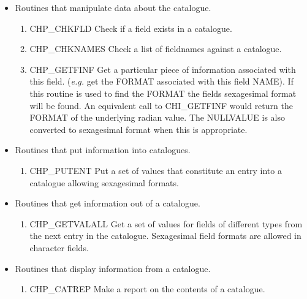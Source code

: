 \begin{itemize}
\item Routines that manipulate data about the catalogue.

 \begin{enumerate}

  \item CHP\_CHKFLD Check if a field exists in a catalogue.

  \item CHP\_CHKNAMES Check a list of fieldnames against a catalogue.

\item CHP\_GETFINF Get a particular piece of information associated with this
field. ({\em e.g.} get the FORMAT associated with this field NAME). If this
routine is used to find the FORMAT the fields sexagesimal format will be found.
An equivalent call to CHI\_GETFINF would return the FORMAT of the underlying
radian value. The NULLVALUE is also converted to sexagesimal format when this
is appropriate.

 \end{enumerate}


\item Routines that put information into catalogues.

 \begin{enumerate}


  \item CHP\_PUTENT Put a set of values that constitute an entry into a
      catalogue allowing sexagesimal formats.

 \end{enumerate}

\item Routines that get information out of a catalogue.

 \begin{enumerate}

  \item  CHP\_GETVALALL Get a set of values for fields of different types
  from the next entry in the catalogue. Sexagesimal field formats
  are allowed in character fields.

 \end{enumerate}

\item Routines that display information from a catalogue.

 \begin{enumerate}

  \item  CHP\_CATREP Make a report on the contents of a catalogue.


\end{enumerate}
\end{itemize}
